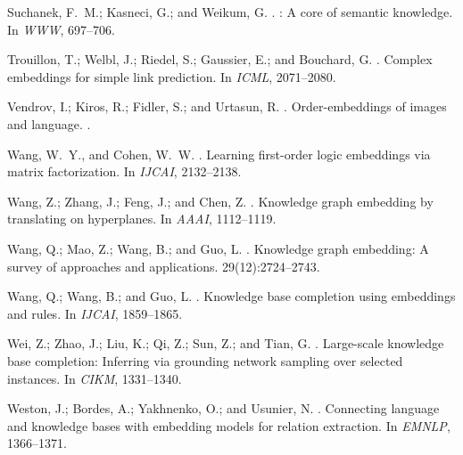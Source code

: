 \documentclass[letterpaper]{article} \usepackage{aaai18}  \usepackage{times}  \usepackage{helvet}  \usepackage{courier}  \usepackage{url}  \usepackage{graphicx}  \usepackage{amsmath}
\begin{document}
\begin{thebibliography}{}
Suchanek, F.~M.; Kasneci, G.; and Weikum, G.
.
: A core of semantic knowledge.
\newblock In {\em WWW},  697--706.

Trouillon, T.; Welbl, J.; Riedel, S.; Gaussier, E.; and Bouchard, G.
.
\newblock Complex embeddings for simple link prediction.
\newblock In {\em ICML},  2071--2080.

Vendrov, I.; Kiros, R.; Fidler, S.; and Urtasun, R.
.
\newblock Order-embeddings of images and language.
.

Wang, W.~Y., and Cohen, W.~W.
.
\newblock Learning first-order logic embeddings via matrix factorization.
\newblock In {\em IJCAI},  2132--2138.

Wang, Z.; Zhang, J.; Feng, J.; and Chen, Z.
.
\newblock Knowledge graph embedding by translating on hyperplanes.
\newblock In {\em AAAI},  1112--1119.

Wang, Q.; Mao, Z.; Wang, B.; and Guo, L.
.
\newblock Knowledge graph embedding: A survey of approaches and applications.
 29(12):2724--2743.

Wang, Q.; Wang, B.; and Guo, L.
.
\newblock Knowledge base completion using embeddings and rules.
\newblock In {\em IJCAI},  1859--1865.

Wei, Z.; Zhao, J.; Liu, K.; Qi, Z.; Sun, Z.; and Tian, G.
.
\newblock Large-scale knowledge base completion: Inferring via grounding
  network sampling over selected instances.
\newblock In {\em CIKM},  1331--1340.

Weston, J.; Bordes, A.; Yakhnenko, O.; and Usunier, N.
.
\newblock Connecting language and knowledge bases with embedding models for
  relation extraction.
\newblock In {\em EMNLP},  1366--1371.


\end{thebibliography}
\end{document}
